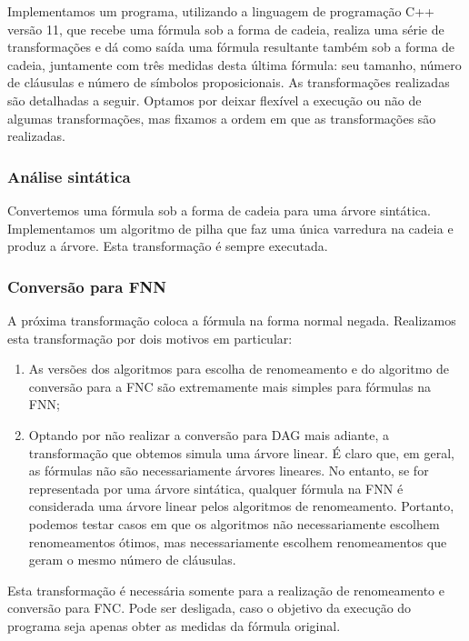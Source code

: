 Implementamos um programa, utilizando a linguagem de programação C++ versão 11, que recebe uma fórmula sob a forma de cadeia, realiza uma série de transformações e dá como saída uma fórmula resultante também sob a forma de cadeia, juntamente com três medidas desta última fórmula: seu tamanho, número de cláusulas e número de símbolos proposicionais. As transformações realizadas são detalhadas a seguir. Optamos por deixar flexível a execução ou não de algumas transformações, mas fixamos a ordem em que as transformações são realizadas.

\subsubsection{Análise sintática}

\indent

Convertemos uma fórmula sob a forma de cadeia para uma árvore sintática. Implementamos um algoritmo de pilha que faz uma única varredura na cadeia e produz a árvore. Esta transformação é sempre executada.

\subsubsection{Conversão para FNN}

\indent

A próxima transformação coloca a fórmula na forma normal negada. Realizamos esta transformação por dois motivos em particular:
\begin{enumerate}
	\item As versões dos algoritmos para escolha de renomeamento e do algoritmo de conversão para a FNC são extremamente mais simples para fórmulas na FNN;
	\item Optando por não realizar a conversão para DAG mais adiante, a transformação que obtemos simula uma árvore linear. É claro que, em geral, as fórmulas não são necessariamente árvores lineares. No entanto, se for representada por uma árvore sintática, qualquer fórmula na FNN é considerada uma árvore linear pelos algoritmos de renomeamento. Portanto, podemos testar casos em que os algoritmos não necessariamente escolhem renomeamentos ótimos, mas necessariamente escolhem renomeamentos que geram o mesmo número de cláusulas.
\end{enumerate}

Esta transformação é necessária somente para a realização de renomeamento e conversão para FNC. Pode ser desligada, caso o objetivo da execução do programa seja apenas obter as medidas da fórmula original.


